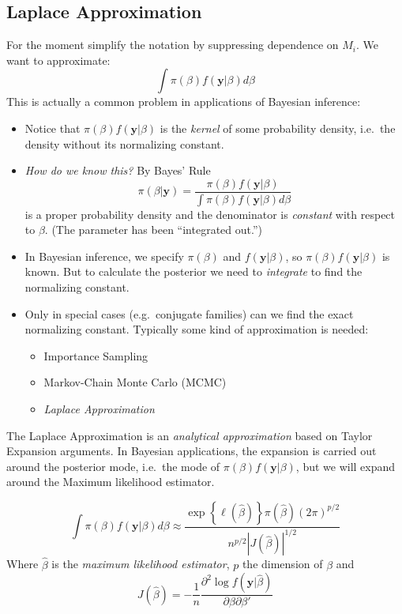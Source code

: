 \subsection{Laplace Approximation}
For the moment simplify the notation by suppressing dependence on $M_i$. We want to approximate: 
	$$\int \pi(\beta)f(\mathbf{y}|\beta)d\beta$$
This is actually a common problem in applications of Bayesian inference:
	\begin{itemize} 
		\item Notice that $\pi(\beta)f(\mathbf{y}|\beta)$ is the \emph{kernel} of some probability density, i.e.\ the density without its normalizing constant. 
		\item \emph{How do we know this?} By Bayes' Rule 
	$$\pi(\beta|\mathbf{y}) = \frac{\pi(\beta)f(\mathbf{y}|\beta)}{\int \pi(\beta)f(\mathbf{y}|\beta) d\beta }$$
is a proper probability density and the denominator is \emph{constant} with respect to $\beta$. (The parameter has been ``integrated out.'')
	\item In Bayesian inference, we specify $\pi(\beta)$ and $f(\mathbf{y}|\beta)$, so $\pi(\beta)f(\mathbf{y}|\beta)$ is known. But to calculate the posterior we need to \emph{integrate} to find the normalizing constant.
	\item Only in special cases (e.g.\ conjugate families) can we find the exact normalizing constant. Typically some kind of approximation is needed:  
		\begin{itemize}
			\item Importance Sampling
			\item Markov-Chain Monte Carlo (MCMC)
			\item \emph{Laplace Approximation}
		\end{itemize}
	\end{itemize}
The Laplace Approximation is an \emph{analytical approximation} based on Taylor Expansion arguments. In Bayesian applications, the expansion is carried out around the posterior mode, i.e.\ the mode of $\pi(\beta)f(\mathbf{y}|\beta)$, but we will expand around the Maximum likelihood estimator. 

\begin{pro}
	\label{pro:laplace}
$$\int \pi(\beta)f(\mathbf{y}|\beta)d\beta \approx \frac{\exp\left\{ \ell(\hat{\beta}) \right\} \pi(\hat{\beta})(2\pi)^{p/2}}{n^{p/2}\left| J(\hat{\beta}) \right|^{1/2}}$$
	Where $\hat{\beta}$ is the \emph{maximum likelihood estimator}, $p$ the dimension of $\beta$ and
		$$J(\hat{\beta}) = -\frac{1}{n} \frac{\partial^2 \log f(\mathbf{y}|\hat{\beta})}{\partial \beta \partial \beta'}$$
\end{pro}

